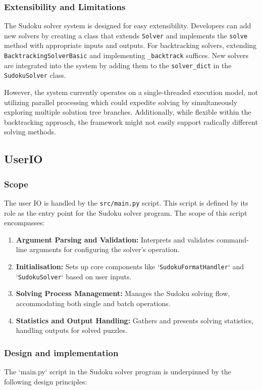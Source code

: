 \documentclass[11pt]{article}
\begin{document}
\subsubsection{Extensibility and Limitations}
The Sudoku solver system is designed for easy extensibility. Developers can add new solvers by creating a class that extends \texttt{Solver} and implements the \texttt{solve} method with appropriate inputs and outputs. For backtracking solvers, extending \texttt{BacktrackingSolverBasic} and implementing \texttt{\_backtrack} suffices. New solvers are integrated into the system by adding them to the \texttt{solver\_dict} in the \texttt{SudokuSolver} class.

However, the system currently operates on a single-threaded execution model, not utilizing parallel processing which could expedite solving by simultaneously exploring multiple solution tree branches. Additionally, while flexible within the backtracking approach, the framework might not easily support radically different solving methods.

\subsection{UserIO}
\subsubsection{Scope}
The user IO is handled by the \texttt{src/main.py} script. This script is defined by its role as the entry point for the Sudoku solver program. The scope of this script encompasses:

\begin{enumerate}
    \item \textbf{Argument Parsing and Validation:} Interprets and validates command-line arguments for configuring the solver's operation.
    \item \textbf{Initialisation:} Sets up core components like `\texttt{SudokuFormatHandler}` and `\texttt{SudokuSolver}` based on user inputs.
    \item \textbf{Solving Process Management:} Manages the Sudoku solving flow, accommodating both single and batch operations.
    \item \textbf{Statistics and Output Handling:} Gathers and presents solving statistics, handling outputs for solved puzzles.
\end{enumerate}

\subsubsection{Design and implementation}
The `main.py` script in the Sudoku solver program is underpinned by the following design principles:
\end{document}
